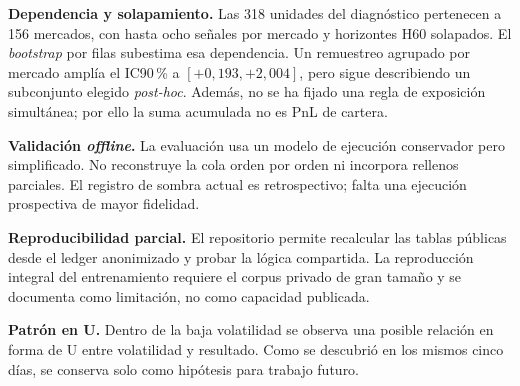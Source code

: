 \textbf{Dependencia y solapamiento.} Las 318 unidades del diagnóstico pertenecen a 156
mercados, con hasta ocho señales por mercado y horizontes H60 solapados. El
\emph{bootstrap} por filas subestima esa dependencia. Un remuestreo agrupado por mercado
amplía el IC90\,\% a $[+0{,}193,+2{,}004]$, pero sigue describiendo un subconjunto elegido
\emph{post-hoc}. Además, no se ha fijado una regla de exposición simultánea; por ello la suma
acumulada no es PnL de cartera.

\textbf{Validación \emph{offline}.} La evaluación usa un modelo de ejecución conservador pero
simplificado. No reconstruye la cola orden por orden ni incorpora rellenos parciales. El
registro de sombra actual es retrospectivo; falta una ejecución prospectiva de mayor
fidelidad.

\textbf{Reproducibilidad parcial.} El repositorio permite recalcular las tablas públicas desde
el ledger anonimizado y probar la lógica compartida. La reproducción integral del
entrenamiento requiere el corpus privado de gran tamaño y se documenta como limitación, no
como capacidad publicada.

\textbf{Patrón en U.} Dentro de la baja volatilidad se observa una posible relación en forma de
U entre volatilidad y resultado. Como se descubrió en los mismos cinco días, se conserva solo
como hipótesis para trabajo futuro.
